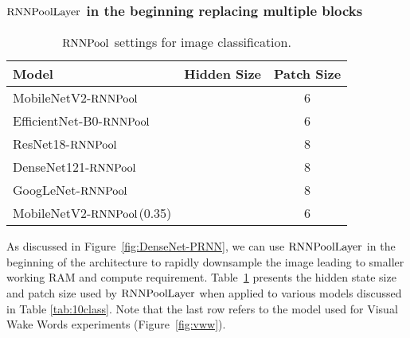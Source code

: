 \documentclass[10pt]{article}
\newcommand{\rpool}{\ensuremath{{\rm RNNPool}}\xspace}
\newcommand{\rpoollayer}{\ensuremath{{\rm RNNPoolLayer}}\xspace}
\begin{document}
\subsubsection{\rpoollayer in the beginning replacing multiple blocks}
\begin{table}[!ht]
\centering
    \caption{\small \rpool settings for image classification.}

\begin{tabular}{l | c |c}
  \toprule
  Model  & Hidden Size &  Patch Size \\
  \midrule
  MobileNetV2-\rpool &  & 6\\  
  EfficientNet-B0-\rpool &  & 6\\  
  ResNet18-\rpool &  & 8\\  
  DenseNet121-\rpool &  & 8\\
  GoogLeNet-\rpool &  & 8\\
  MobileNetV2-\rpool (0.35) &  & 6\\
  \bottomrule
\end{tabular}
\label{tab:rpool-hparam-img}
\end{table} \label{sec:toprep}
As discussed in Figure~\ref{fig:DenseNet-PRNN}, we can use \rpoollayer in the beginning of the architecture to rapidly downsample the image leading to smaller working RAM and compute requirement. Table~\ref{tab:rpool-hparam-img} presents the hidden state size and patch size used by \rpoollayer when applied to various models discussed in Table 
\ref{tab:10class}. 
Note that the last row refers to the model used for Visual Wake Words experiments (Figure~\ref{fig:vww}). 
\end{document}

